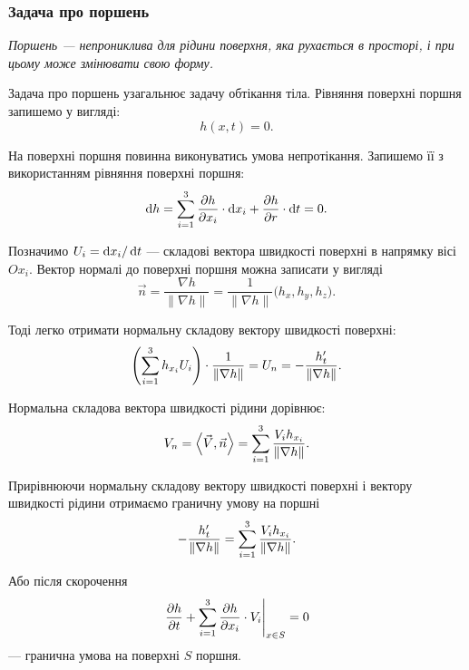 \subsubsection{Задача про поршень}

\begin{definition}[поршня]
	\it{Поршень} --- непрониклива для рідини поверхня, яка рухається в просторі, і при цьому може змінювати свою форму. 
\end{definition}

Задача про поршень узагальнює задачу обтікання тіла. Рівняння поверхні поршня запишемо у вигляді:
\begin{equation}
	h(x, t) = 0.
\end{equation}

На поверхні поршня повинна виконуватись умова непротікання. Запишемо її з використанням рівняння поверхні поршня:
\begin{equation}
	\mathop{}\!\mathrm{d} h = \displaystyle\sum\limits_{i = 1}^3 \frac{\partial h}{\partial x_i} \cdot \mathop{}\!\mathrm{d} x_i + \frac{\partial h}{\partial r} \cdot \mathop{}\!\mathrm{d} t = 0.
\end{equation}

Позначимо $U_i = \mathop{}\!\mathrm{d} x_i / \mathop{}\!\mathrm{d} t$ --- складові вектора швидкості поверхні в напрямку вісі $Ox_i$. Вектор нормалі до поверхні поршня можна записати у вигляді
\begin{equation}
	\vec n = \frac{\nabla h}{\|\nabla h\|} = \frac{1}{\|\nabla h\|} \big( h_x, h_y, h_z \big).
\end{equation}

Тоді легко отримати нормальну складову вектору швидкості поверхні:
\begin{equation}
	\left( \displaystyle\sum\limits_{i = 1}^3 h_{x_i} U_i \right) \cdot \frac{1}{\|\nabla h\|} = U_n = - \frac{h_t'}{\|\nabla h\|}.
\end{equation}

Нормальна складова вектора швидкості рідини дорівнює:
\begin{equation}
	V_n = \langle \vec V, \vec n\rangle = \Sum_{i = 1}^3 \frac{V_i h_{x_i}}{\|\nabla h\|}.
\end{equation}

Прирівнюючи нормальну складову вектору швидкості поверхні і вектору швидкості рідини отримаємо граничну умову на поршні 
\begin{equation}
	- \frac{h_t'}{\|\nabla h\|} = \displaystyle\sum\limits_{i = 1}^3 \frac{V_i h_{x_i}}{\|\nabla h\|}.
\end{equation}

Або після скорочення
\begin{equation}
	\left. \frac{\partial h}{\partial t} + \displaystyle\sum\limits_{i = 1}^3 \frac{\partial h}{\partial x_i} \cdot V_i \right|_{x \in S} = 0
\end{equation}
--- гранична умова на поверхні $S$ поршня.

